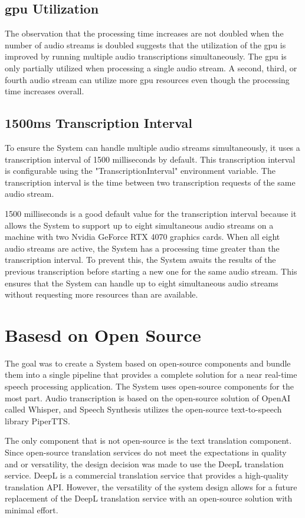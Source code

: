 \subsection{\ac{gpu} Utilization}

The observation that the processing time increases are not doubled when the number of audio streams is doubled suggests 
that the utilization of the \ac{gpu} is improved by running multiple audio transcriptions simultaneously. The \ac{gpu} 
is only partially utilized when processing a single audio stream. A second, third, or fourth audio stream can utilize 
more \ac{gpu} resources even though the processing time increases overall.

\subsection{1500ms Transcription Interval}

To ensure the System can handle multiple audio streams simultaneously, it uses a transcription interval of 1500 
milliseconds by default. This transcription interval is configurable using the "TranscriptionInterval" environment 
variable. The transcription interval is the time between two transcription requests of the same audio stream.

1500 milliseconds is a good default value for the transcription interval because it allows the System to support up to 
eight simultaneous audio streams on a machine with two Nvidia GeForce RTX 4070 graphics cards. When all eight audio 
streams are active, the System has a processing time greater than the transcription interval. To prevent this, 
the System awaits the results of the previous transcription before starting a new one for the same audio stream. This 
ensures that the System can handle up to eight simultaneous audio streams without requesting more resources than are 
available.


\section{Basesd on Open Source}

The goal was to create a System based on open-source components and bundle them into a single pipeline that provides a 
complete solution for a near real-time speech processing application. The System uses open-source components for the 
most part. Audio transcription is based on the open-source solution of OpenAI called Whisper, and Speech Synthesis 
utilizes the open-source text-to-speech library PiperTTS.

The only component that is not open-source is the text translation component. Since open-source translation 
services do not meet the expectations in quality and or versatility, the design decision was made to use the DeepL 
translation service. DeepL is a commercial translation service that provides a high-quality translation API. However, 
the versatility of the system design allows for a future replacement of the DeepL translation service with an 
open-source solution with minimal effort.
